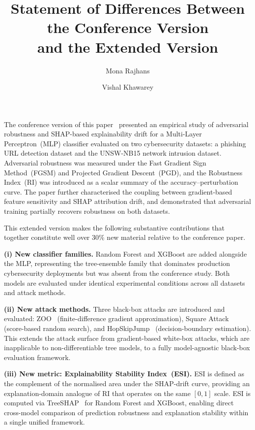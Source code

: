 \documentclass[12pt]{article}
\title{Statement of Differences Between the Conference Version\\
and the Extended Version}
\author{Mona Rajhans \and Vishal Khawarey}
\date{}
\begin{document}
\maketitle

\noindent
The conference version of this paper~\cite{khawarey2026empirical} presented an
empirical study of adversarial robustness and SHAP-based explainability drift for
a Multi-Layer Perceptron~(MLP) classifier evaluated on two cybersecurity datasets:
a phishing URL detection dataset and the UNSW-NB15 network intrusion dataset.
Adversarial robustness was measured under the Fast Gradient Sign Method~(FGSM) and
Projected Gradient Descent~(PGD), and the Robustness Index~(RI) was introduced as
a scalar summary of the accuracy--perturbation curve.  The paper further
characterised the coupling between gradient-based feature sensitivity and SHAP
attribution drift, and demonstrated that adversarial training partially recovers
robustness on both datasets.

This extended version makes the following substantive contributions that together
constitute well over 30\% new material relative to the conference paper.

\textbf{(i) New classifier families.}
Random Forest and XGBoost are added alongside the MLP, representing the
tree-ensemble family that dominates production cybersecurity deployments but was
absent from the conference study.  Both models are evaluated under identical
experimental conditions across all datasets and attack methods.

\textbf{(ii) New attack methods.}
Three black-box attacks are introduced and evaluated: ZOO~\cite{chen2017zoo}
(finite-difference gradient approximation), Square
Attack~\cite{andriushchenko2020square} (score-based random search), and
HopSkipJump~\cite{chen2020hopskipjump} (decision-boundary estimation).  This
extends the attack surface from gradient-based white-box attacks, which are
inapplicable to non-differentiable tree models, to a fully model-agnostic
black-box evaluation framework.

\textbf{(iii) New metric: Explainability Stability Index~(ESI).}
ESI is defined as the complement of the normalised area under the SHAP-drift curve,
providing an explanation-domain analogue of RI that operates on the same
$[0,1]$ scale.  ESI is computed via TreeSHAP~\cite{lundberg2020treeshap} for
Random Forest and XGBoost, enabling direct cross-model comparison of prediction
robustness and explanation stability within a single unified framework.
\end{document}
